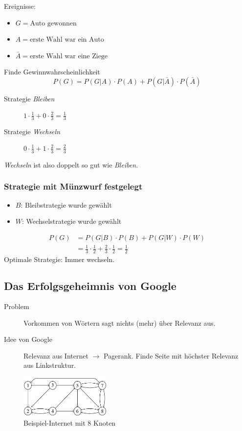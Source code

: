 \documentclass[10pt,a4paper]{scrartcl}
\begin{document}
Ereignisse:
\begin{itemize}
\item $G = \text{Auto gewonnen}$
\item $A = \text{erste Wahl war ein Auto}$
\item $\bar{A} = \text{erste Wahl war eine Ziege}$
\end{itemize}

Finde Gewinnwahrscheinlichkeit
$$P(G) = P(G|A) \cdot P(A) + P(G|\bar{A}) \cdot P(\bar{A})$$
\begin{description}
\item[Strategie \emph{Bleiben}] $1 \cdot \frac{1}{3} + 0 \cdot \frac{2}{3} = \frac{1}{3}$
\item[Strategie \emph{Wechseln}] $0 \cdot \frac{1}{3} + 1 \cdot \frac{2}{3} = \frac{2}{3}$
\end{description}
\emph{Wechseln} ist also doppelt so gut wie \emph{Bleiben}.

\subsubsection{Strategie mit Münzwurf festgelegt}
\begin{itemize}
\item $B$: Bleibstrategie wurde gewählt
\item $W$: Wechselstrategie wurde gewählt
\end{itemize}
\begin{align*}
P(G) & = P(G|B) \cdot P(B) + P(G|W) \cdot P(W) \\
	& = \frac{1}{3}\cdot\frac{1}{2} + \frac{2}{3}\cdot\frac{1}{2} = \frac{1}{2}
\end{align*}
Optimale Strategie: Immer wechseln.

\subsection{Das Erfolgsgeheimnis von Google}
\begin{description}
\item[Problem] Vorkommen von Wörtern sagt nichts (mehr) über Relevanz aus.
\item[Idee von Google] Relevanz aus Internet $\rightarrow$ Pagerank. Finde Seite mit höchster Relevanz aus Linkstruktur.
\end{description}

\begin{figure}
    \centering
    \includegraphics[width=0.4\textwidth]{images/google-internet.png}
    \caption{Beispiel-Internet mit 8 Knoten}
    \label{fig:awesome_image}
\end{figure}
\end{document}
